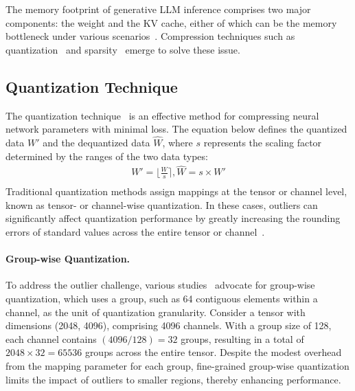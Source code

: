 The memory footprint of generative LLM inference comprises two major components: the weight and the KV cache, either of which can be the memory bottleneck under various scenarios~\cite{hooper2024kvquant, liu2024kivi,kang2024gear,zhao2023atom,sheng2023flexgen,guo2024survey}.
Compression techniques such as quantization~\cite{han2015deep,guo2022ant,zadeh2022mokey,zadeh2020gobo,zhao2023atom,lin2023awq,guo2023olive, frantar2023gptq,li2023efficientadaptiveactivationrounding,dettmers2022llm} and sparsity~\cite{guo2020accelerating,frantar2023sparsegptmassivelanguagemodels,wang2021dual,guan2020far,guan2022block,guan2022transkimmer,guan2024fractal,NIPS1989_6c9882bb,zhang_h_2o_2023,zhang_q-hitter_2024,zhang2024dstc, guo2024accelerating,qiu2019adversarial} emerge to solve these issue.

\subsection{Quantization Technique}
\label{sec:bg_quantization}

The quantization technique~\cite{yao2020zeroquant,dettmers2022llm,shao2024omniquant,frantar2023gptq,guo2022squant,shen2020q} is an effective method for compressing neural network parameters with minimal loss.
The equation below defines the quantized data $W'$ and the dequantized data $\hat{W}$, where $s$ represents the scaling factor determined by the ranges of the two data types:
\begin{equation}
    \begin{array}{c}
        W' = \lfloor \frac{W}{s} \rceil, \hat{W} = s \times W' \\
    \end{array}
\label{quant_and_deq}
\end{equation}
Traditional quantization methods assign mappings at the tensor or channel level, known as tensor- or channel-wise quantization.
In these cases, outliers can significantly affect quantization performance by greatly increasing the rounding errors of standard values across the entire tensor or channel~\cite{dettmers2022llm,guo2023olive}.


\paragraph{Group-wise Quantization.}
To address the outlier challenge, various studies~\cite{zhao2023atom,lin2023awq,frantar2023gptq,shao2024omniquant,dai2021vsquant} advocate for group-wise quantization, which uses a group, such as 64 contiguous elements within a channel, as the unit of quantization granularity.
Consider a tensor with dimensions (2048, 4096), comprising 4096 channels.
With a group size of 128, each channel contains $(4096/128) = 32$ groups, resulting in a total of $2048 \times 32 = 65536$ groups across the entire tensor.
Despite the modest overhead from the mapping parameter for each group, fine-grained group-wise quantization limits the impact of outliers to smaller regions, thereby enhancing performance.

